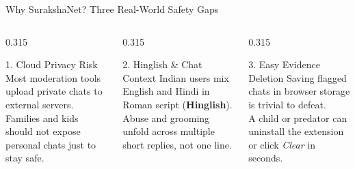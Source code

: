 \documentclass[aspectratio=169,10pt]{beamer}
\begin{document}
\begin{frame}{Why SurakshaNet? Three Real-World Safety Gaps}
  \begin{columns}[T]
    \begin{column}{0.315\textwidth}
      \begin{softcard}[snBlue!45]{1. Cloud Privacy Risk}
        \scriptsize
        Most moderation tools upload private chats to external servers.\\[5pt]
        Families and kids should not expose personal chats just to stay safe.
      \end{softcard}
    \end{column}
    \begin{column}{0.315\textwidth}
      \begin{softcard}[snAmber!60]{2. Hinglish \& Chat Context}
        \scriptsize
        Indian users mix English and Hindi in Roman script (\textbf{Hinglish}).\\[5pt]
        Abuse and grooming unfold across multiple short replies, not one line.
      \end{softcard}
    \end{column}
    \begin{column}{0.315\textwidth}
      \begin{softcard}[snRed!55]{3. Easy Evidence Deletion}
        \scriptsize
        Saving flagged chats in browser storage is trivial to defeat.\\[5pt]
        A child or predator can uninstall the extension or click \textit{Clear} in seconds.
      \end{softcard}
    \end{column}
  \end{columns}

  \vspace{0.45cm}

  \begin{center}
\end{center}
\end{frame}
\end{document}
